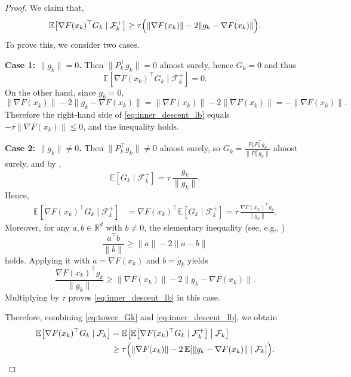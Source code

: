 \documentclass[10pt]{article}
\begin{document}
\begin{proof}
We claim that,
\begin{align}
\mathbb{E}\!\left[\nabla F(x_k)^\top G_k \mid \mathcal{F}_k^+\right]
\ge
\tau\Bigl(\|\nabla F(x_k)\|-2\|g_k-\nabla F(x_k)\|\Bigr).
\label{eq:inner_descent_lb}
\end{align}
To prove this, we consider two cases.

\smallskip
\noindent\textbf{Case 1: $\|g_k\|=0$.}
Then $\|P_k^\top g_k\|=0$ almost surely, hence $G_k=0$ and thus
\[
\mathbb{E}\!\left[\nabla F(x_k)^\top G_k \mid \mathcal{F}_k^+\right]=0.
\]
On the other hand, since $g_k=0$,
\[
\|\nabla F(x_k)\|-2\|g_k-\nabla F(x_k)\|
=
\|\nabla F(x_k)\|-2\|\nabla F(x_k)\|
=
-\|\nabla F(x_k)\|.
\]
Therefore the right-hand side of \eqref{eq:inner_descent_lb} equals
$-\tau\|\nabla F(x_k)\|\le 0$, and the inequality holds.

\smallskip
\noindent\textbf{Case 2: $\|g_k\|\neq 0$.}
Then $\|P_k^\top g_k\|\neq 0$ almost surely, so
$G_k=\frac{P_kP_k^\top g_k}{\|P_k^\top g_k\|}$ almost surely, and by ,
\[
\mathbb{E}\!\left[G_k\mid \mathcal{F}_k^+\right]
=
\tau\,\frac{g_k}{\|g_k\|}.
\]
Hence,
\begin{align*}
\mathbb{E}\!\left[\nabla F(x_k)^\top G_k \mid \mathcal{F}_k^+\right]
&=
\nabla F(x_k)^\top
\mathbb{E}\!\left[G_k\mid \mathcal{F}_k^+\right]
=
\tau\,\frac{\nabla F(x_k)^\top g_k}{\|g_k\|}.
\end{align*}
Moreover, for any $a,b\in\mathbb{R}^d$ with $b\neq 0$, the elementary inequality (see, e.g., \citet{huebler2025})
\[
\frac{a^\top b}{\|b\|}
\ge
\|a\|-2\|a-b\|
\]
holds. Applying it with $a=\nabla F(x_k)$ and $b=g_k$ yields
\[
\frac{\nabla F(x_k)^\top g_k}{\|g_k\|}
\ge
\|\nabla F(x_k)\|-2\|g_k-\nabla F(x_k)\|.
\]
Multiplying by $\tau$ proves \eqref{eq:inner_descent_lb} in this case.

\smallskip
\noindent
Therefore, combining \eqref{eq:tower_Gk} and \eqref{eq:inner_descent_lb}, we obtain
\begin{align}
\mathbb{E}\!\left[\nabla F(x_k)^\top G_k \mid \mathcal{F}_k\right]
&=
\mathbb{E}\!\left[
\mathbb{E}\!\left[\nabla F(x_k)^\top G_k \mid \mathcal{F}_k^+\right]
\;\middle|\;
\mathcal{F}_k
\right] \notag\\
&\ge
\tau\Bigl(
\|\nabla F(x_k)\|
-
2\,\mathbb{E}\!\left[\|g_k-\nabla F(x_k)\|\mid\mathcal{F}_k\right]
\Bigr).
\label{eq:descent_conditional_Fk}
\end{align}


\end{proof}
\end{document}
